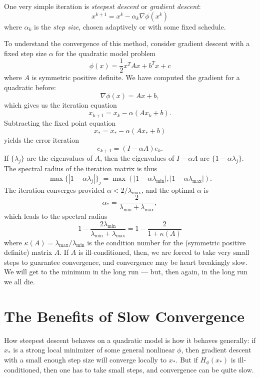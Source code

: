 \documentclass[12pt, leqno]{article} %
\begin{document}
One very simple iteration is {\em steepest descent}
or {\em gradient descent}:
\begin{equation} \label{iter:gd}
  x^{k+1} = x^k - \alpha_k \nabla \phi(x^k)
\end{equation}
where $\alpha_k$ is the {\em step size}, chosen adaptively or
with some fixed schedule.

To understand the convergence of this method, consider gradient
descent with a fixed step size $\alpha$ for the quadratic model problem
\[
  \phi(x) = \frac{1}{2} x^T A x + b^T x + c
\]
where $A$ is symmetric positive definite.  
We have computed the gradient for a quadratic before:
\[
  \nabla \phi(x) = Ax + b,
\]
which gives us the iteration equation
\[
  x_{k+1} = x_k - \alpha (A x_k + b).
\]
Subtracting the fixed point equation
\[
  x_* = x_* - \alpha (A x_* + b)
\]
yields the error iteration
\[
  e_{k+1} = (I-\alpha A) e_k.
\]
If $\{ \lambda_j \}$ are the eigenvalues of $A$, then the
eigenvalues of $I-\alpha A$ are $\{ 1-\alpha \lambda_j \}$.
The spectral radius of the iteration matrix is thus
\[
  \max \{ |1-\alpha \lambda_j| \}_j =
  \max \left( |1-\alpha \lambda_{\min}|, |1-\alpha \lambda_{\max}| \right).
\]
The iteration converges provided $\alpha < 2/\lambda_{\max}$, and the
optimal $\alpha$ is
\[
  \alpha_* = \frac{2}{\lambda_{\min} + \lambda_{\max}},
\]
which leads to the spectral radius
\[
  1 - \frac{2 \lambda_{\min}}{\lambda_{\min} + \lambda_{\max}} =
  1 - \frac{2}{1 + \kappa(A)}
\]
where $\kappa(A) = \lambda_{\max}/\lambda_{\min}$ is the condition
number for the (symmetric positive definite) matrix $A$.  If $A$
is ill-conditioned, then, we are forced to take very small steps
to guarantee convergence, and convergence may be
heart breakingly slow.  We will get to the minimum in the long run
--- but, then again, in the long run we all die.

\section{The Benefits of Slow Convergence}

How steepest descent behaves on a quadratic model
is how it behaves generally: if $x_*$ is a
strong local minimizer of some general nonlinear $\phi$, then gradient
descent with a small enough step size will converge locally to
$x_*$.  But if $H_{\phi}(x_*)$ is ill-conditioned, then one has to
take small steps, and convergence can be quite slow.
\end{document}
